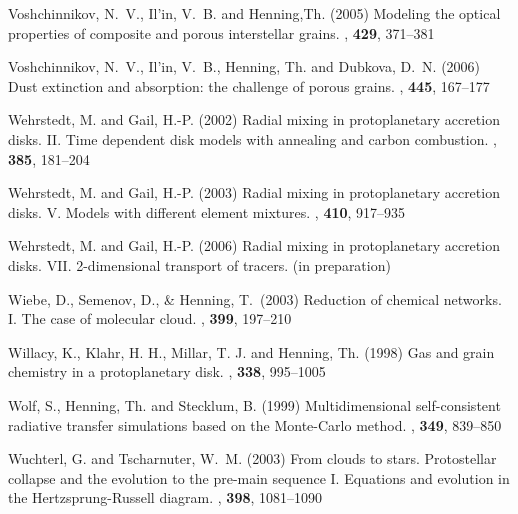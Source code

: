 \begin{ownpubl}
\item Voshchinnikov, N.~V., Il'in, V.~B. and Henning,Th. (2005) Modeling the
optical properties of composite and porous interstellar grains. \aap,
\textbf{429}, 371--381

\item Voshchinnikov, N.~V., Il'in, V.~B., Henning, Th. and Dubkova, D.~N.
(2006) Dust extinction and absorption: the challenge of porous grains.
\aap, \textbf{445}, 167--177

\item
Wehrstedt, M. and Gail, H.-P. (2002) Radial mixing in protoplanetary accretion
disks. II. Time dependent disk models with annealing and carbon combustion.
\aap, \textbf{385}, 181--204

\item
Wehrstedt, M. and Gail, H.-P. (2003) Radial mixing in protoplanetary accretion
disks. V. Models with different element mixtures. \aap, \textbf{410}, 917--935

\item
Wehrstedt, M. and Gail, H.-P. (2006) Radial mixing in protoplanetary accretion
disks. VII. 2-dimensional transport of tracers. (in preparation)

\item
Wiebe, D., Semenov, D., \& Henning, T.\ (2003) Reduction of chemical networks.
I. The case of molecular cloud. \aap, \textbf{399}, 197--210

\item
Willacy, K., Klahr, H. H., Millar, T. J. and Henning, Th. (1998)
Gas and grain chemistry in a protoplanetary disk. \aap, \textbf{338}, 995--1005

\item
Wolf, S., Henning, Th. and Stecklum, B. (1999) Multidimensional self-consistent
radiative transfer simulations based on the Monte-Carlo method. \aap,
\textbf{349}, 839--850

\item
Wuchterl, G. and Tscharnuter, W.~M. (2003) From clouds to stars.  Protostellar
collapse and the evolution to the pre-main sequence I. Equations and evolution
in the Hertzsprung-Russell diagram. \aap, \textbf{398}, 1081--1090

\end{ownpubl}
%

